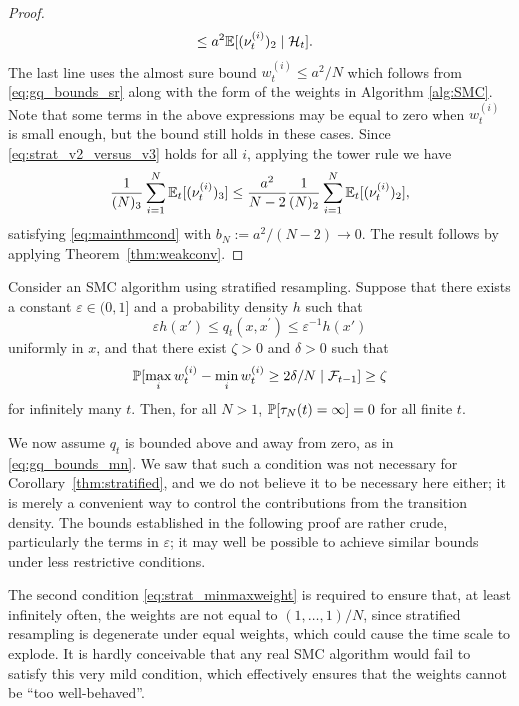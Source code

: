 \begin{proof}
\begin{align}
&\leq a^2 \mathbb{E} [(\nu_t^{(i)})_2 \mid \mathcal{H}_t ] . \label{eq:strat_v2_versus_v3}
\end{align}
The last line uses the almost sure bound $w_t^{(i)} \leq a^2 /N$ which follows from \eqref{eq:gq_bounds_sr} along with the form of the weights in Algorithm \ref{alg:SMC}.
Note that some terms in the above expressions may be equal to zero when $w_t^{(i)}$ is small enough, but the bound still holds in these cases.
Since \eqref{eq:strat_v2_versus_v3} holds for all $i$, applying the tower rule we have
\begin{equation*}
\frac{1}{(N)_3} \sum_{i=1}^{N} \mathbb{E}_t [(\nu_t^{(i)})_3 ]
\leq \frac{a^2}{N-2} \frac{1}{(N)_2} \sum_{i=1}^{N} \mathbb{E}_t [(\nu_t^{(i)})_2 ] ,
\end{equation*}
satisfying \eqref{eq:mainthmcond} with $b_N := a^2/(N-2) \rightarrow 0$.
The result follows by applying Theorem~\ref{thm:weakconv}.
\end{proof}



\begin{prop}\label{thm:strat_nontriviality}
Consider an SMC algorithm using stratified resampling.
Suppose that there exists a constant $\varepsilon \in (0,1]$ and a probability density $h$ such that
\begin{equation*}
\varepsilon h(x') \leq q_t(x, x^\prime) \leq \varepsilon^{-1} h(x')
\end{equation*}
uniformly in $x$, and that there exist $\zeta >0$ and $\delta >0$ such that 
\begin{equation}
\mathbb{P}[ \max_i w_t^{(i)} - \min_i w_t^{(i)} \geq 2\delta/N \mid \mathcal{F}_{t-1} ] \geq \zeta \label{eq:strat_minmaxweight}
\end{equation}
 for infinitely many $t$. Then, for all $N>1$, $\mathbb{P}[ \tau_N(t) = \infty ] =0$ for all finite $t$.
\end{prop}
We now assume $q_t$ is bounded above and away from zero, as in \eqref{eq:gq_bounds_mn}.
We saw that such a condition was not necessary for Corollary~\ref{thm:stratified}, and we do not believe it to be necessary here either; it is merely a convenient way to control the contributions from the transition density. The bounds established in the following proof are rather crude, particularly the terms in $\varepsilon$; it may well be possible to achieve similar bounds under less restrictive conditions.

The second condition \eqref{eq:strat_minmaxweight} is required to ensure that, at least infinitely often, the weights are not equal to $(1,\dots,1)/N$, since stratified resampling is degenerate under equal weights, which could cause the time scale to explode. 
It is hardly conceivable that any real SMC algorithm would fail to satisfy this very mild condition, which effectively ensures that the weights cannot be ``too well-behaved''.


